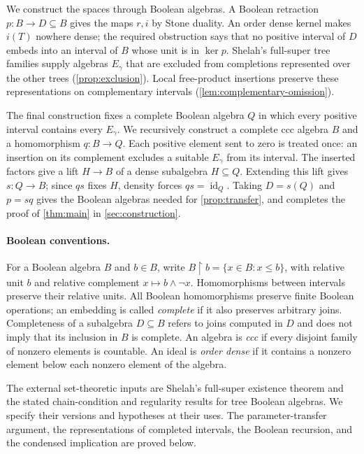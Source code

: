 \documentclass[11pt]{article}
\theoremstyle{definition}
\theoremstyle{remark}
\newcommand{\restr}{\mathbin{\upharpoonright}}
\newcommand{\id}{\operatorname{id}}
\begin{document}
We construct the spaces through Boolean algebras. A Boolean retraction
$p:B\to D\subseteq B$ gives the maps $r,i$ by Stone duality. An order
dense kernel makes $i(T)$ nowhere dense; the required obstruction says
that no positive interval of $D$ embeds into an interval of $B$ whose
unit is in $\ker p$. Shelah's full-super tree families supply algebras
$E_\gamma$ that are excluded from completions represented over the
other trees (\cref{prop:exclusion}). Local free-product insertions
preserve these representations on complementary intervals
(\cref{lem:complementary-omission}).

The final construction fixes a complete Boolean algebra $Q$ in which
every positive interval contains every $E_\gamma$. We recursively
construct a complete ccc algebra $B$ and a homomorphism $q:B\to Q$.
Each positive element sent to zero is treated once: an insertion on
its complement excludes a suitable $E_\gamma$ from its interval.
The inserted factors give a lift $H\to B$ of a dense subalgebra
$H\subseteq Q$. Extending this lift gives $s:Q\to B$; since $qs$
fixes $H$, density forces $qs=\id_Q$. Taking $D=s(Q)$ and $p=sq$ gives
the Boolean algebras needed for \cref{prop:transfer}, and completes
the proof of \cref{thm:main} in \cref{sec:construction}.

\paragraph{Boolean conventions.}
For a Boolean algebra $B$ and $b\in B$, write
$B\restr b=\{x\in B:x\leq b\}$, with relative unit $b$ and relative
complement $x\mapsto b\wedge\neg x$. Homomorphisms between intervals
preserve their relative units. All Boolean homomorphisms preserve
finite Boolean operations; an embedding is called \emph{complete}
if it also preserves arbitrary joins. Completeness of a subalgebra
$D\subseteq B$ refers to joins computed in $D$ and does not imply
that its inclusion in $B$ is complete. An algebra is \emph{ccc} if
every disjoint family of nonzero elements is countable. An ideal is
\emph{order dense} if it contains a nonzero element below each
nonzero element of the algebra.

The external set-theoretic inputs are Shelah's full-super existence
theorem and the stated chain-condition and regularity results for
tree Boolean algebras. We specify their versions and hypotheses at
their uses. The parameter-transfer argument, the representations of
completed intervals, the Boolean recursion, and the condensed
implication are proved below.
\end{document}
